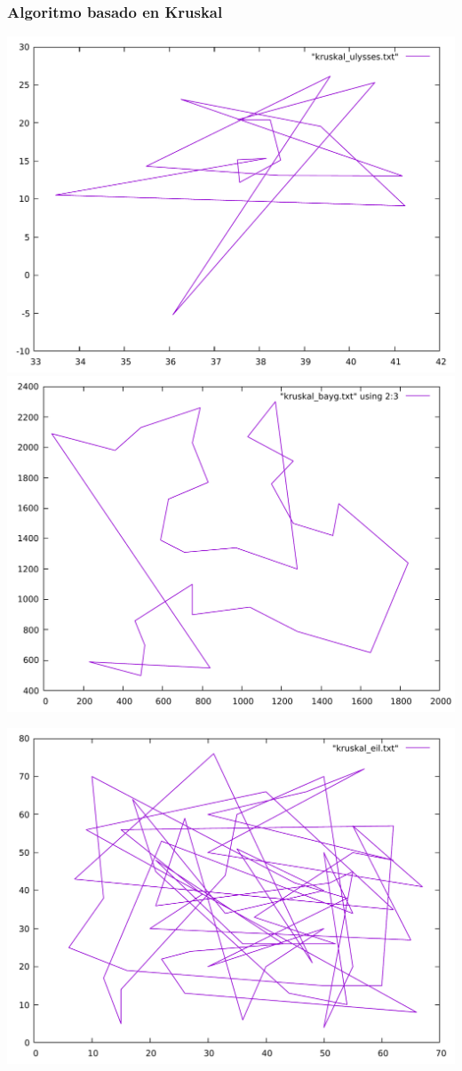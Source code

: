 \documentclass[13pt]{beamer}
\begin{document}
	\begin{frame}
		\frametitle{Algoritmo basado en Kruskal}
			\includegraphics[scale=0.2]{../src/kruskal_ulysses.pdf}
			\includegraphics[scale=0.2]{../src/kruskal_bayg.pdf}
			\begin{center}
				\includegraphics[scale=0.2]{../src/kruskal_eil.pdf}
			\end{center}
	\end{frame}
\end{document}
